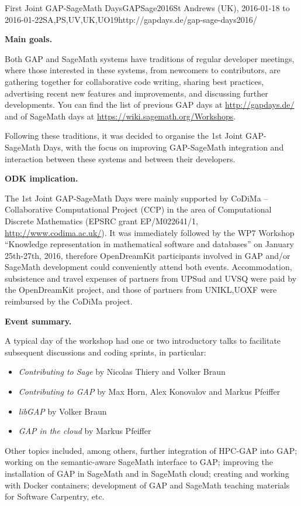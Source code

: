 \begin{event}{First Joint GAP-SageMath Days}{GAPSage2016}{St Andrews (UK),
2016-01-18 to 2016-01-22}{SA,PS,UV,UK,UO}{19}{http://gapdays.de/gap-sage-days2016/}

\textbf{Main goals.}

Both GAP and SageMath systems have traditions of regular developer meetings, where those
interested in these systems, from newcomers to contributors, are gathering together for
collaborative code writing, sharing best practices, advertising recent new features and
improvements, and discussing further developments. You can find the list of previous GAP 
days at \url{http://gapdays.de/} and of SageMath days at \url{https://wiki.sagemath.org/Workshops}.

Following these traditions, it was decided to organise the 1st Joint GAP-SageMath Days, with the
focus on improving GAP-SageMath integration and interaction between these systems and between
their developers.

\textbf{ODK implication.} 

The 1st Joint GAP-SageMath Days were mainly supported by CoDiMa -- Collaborative Computational
Project (CCP) in the area of Computational Discrete Mathematics (EPSRC grant EP/M022641/1,
\url{http://www.codima.ac.uk/}). It was immediately followed by the WP7 Workshop ``Knowledge
representation in mathematical software and databases'' on January 25th-27th, 2016, therefore
OpenDreamKit participants involved in GAP and/or SageMath development could conveniently attend
both events. Accommodation, subsistence and travel expenses of partners from UPSud and UVSQ
were paid by the OpenDreamKit project, and those of partners from UNIKL,UOXF were reimbursed
by the CoDiMa project.

\textbf{Event summary.} 

A typical day of the workshop had one or two introductory talks to facilitate subsequent
discussions and coding sprints, in particular:
\begin{itemize}
\item \emph{Contributing to Sage} by Nicolas Thiery and Volker Braun
\item \emph{Contributing to GAP } by Max Horn, Alex Konovalov and Markus Pfeiffer
\item \emph{libGAP} by Volker Braun
\item \emph{GAP in the cloud} by Markus Pfeiffer
\end{itemize}
Other topics included, among others,
further integration of HPC-GAP into GAP;
working on the semantic-aware SageMath interface to GAP;
improving the installation of GAP in SageMath and in SageMath cloud;
creating and working with Docker containers;
development of GAP and SageMath teaching materials for Software Carpentry,
etc.


\end{event}
